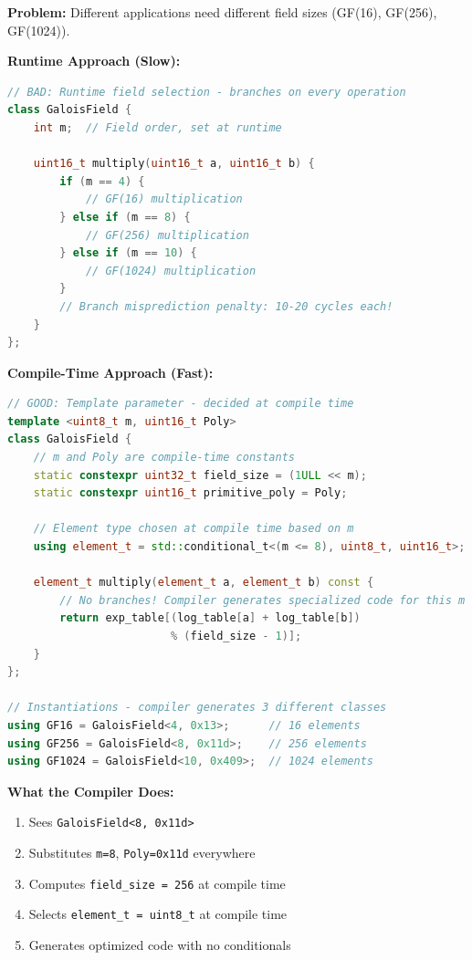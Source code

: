 \documentclass[11pt,a4paper]{article}
\begin{document}
\textbf{Problem:} Different applications need different field sizes (GF(16), GF(256), GF(1024)).

\textbf{Runtime Approach (Slow):}
\begin{lstlisting}[language=C++, basicstyle=\small\ttfamily]
// BAD: Runtime field selection - branches on every operation
class GaloisField {
    int m;  // Field order, set at runtime

    uint16_t multiply(uint16_t a, uint16_t b) {
        if (m == 4) {
            // GF(16) multiplication
        } else if (m == 8) {
            // GF(256) multiplication
        } else if (m == 10) {
            // GF(1024) multiplication
        }
        // Branch misprediction penalty: 10-20 cycles each!
    }
};
\end{lstlisting}

\textbf{Compile-Time Approach (Fast):}
\begin{lstlisting}[language=C++, basicstyle=\small\ttfamily]
// GOOD: Template parameter - decided at compile time
template <uint8_t m, uint16_t Poly>
class GaloisField {
    // m and Poly are compile-time constants
    static constexpr uint32_t field_size = (1ULL << m);
    static constexpr uint16_t primitive_poly = Poly;

    // Element type chosen at compile time based on m
    using element_t = std::conditional_t<(m <= 8), uint8_t, uint16_t>;

    element_t multiply(element_t a, element_t b) const {
        // No branches! Compiler generates specialized code for this m
        return exp_table[(log_table[a] + log_table[b])
                         % (field_size - 1)];
    }
};

// Instantiations - compiler generates 3 different classes
using GF16 = GaloisField<4, 0x13>;      // 16 elements
using GF256 = GaloisField<8, 0x11d>;    // 256 elements
using GF1024 = GaloisField<10, 0x409>;  // 1024 elements
\end{lstlisting}

\textbf{What the Compiler Does:}
\begin{enumerate}
    \item Sees \texttt{GaloisField<8, 0x11d>}
    \item Substitutes \texttt{m=8}, \texttt{Poly=0x11d} everywhere
    \item Computes \texttt{field\_size = 256} at compile time
    \item Selects \texttt{element\_t = uint8\_t} at compile time
    \item Generates optimized code with no conditionals
\end{enumerate}
\end{document}
